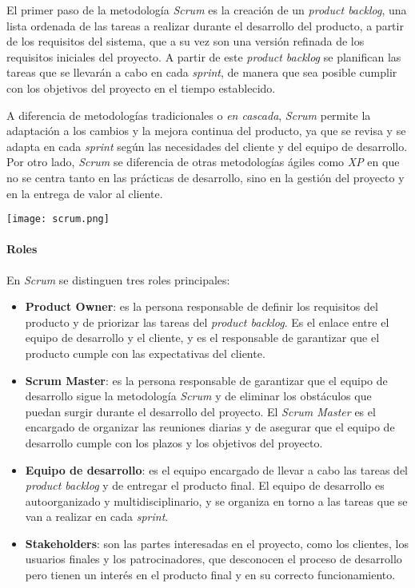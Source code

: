 El primer paso de la metodología \textit{Scrum} es la creación de un \textit{product backlog},
una lista ordenada de las tareas a realizar durante el desarrollo del producto, a partir de los
requisitos del sistema, que a su vez son una versión refinada de los requisitos iniciales del
proyecto. A partir de este \textit{product backlog} se planifican las tareas que se llevarán
a cabo en cada \textit{sprint}, de manera que sea posible cumplir con los objetivos del proyecto
en el tiempo establecido.

A diferencia de metodologías tradicionales o \emph{en cascada}, \textit{Scrum} permite la adaptación
a los cambios y la mejora continua del producto, ya que se revisa y se adapta en cada \textit{sprint}
según las necesidades del cliente y del equipo de desarrollo. Por otro lado, \textit{Scrum} se
diferencia de otras metodologías ágiles como \textit{XP} en que no se centra tanto en las
prácticas de desarrollo, sino en la gestión del proyecto y en la entrega de valor al cliente.

\begin{minipage}{\linewidth}
	\centering
	\texttt{[image: scrum.png]}
\end{minipage}

\paragraph{Roles}
En \textit{Scrum} se distinguen tres roles principales:

\begin{itemize}
	\item \textbf{Product Owner}: es la persona responsable de definir los requisitos del producto
		y de priorizar las tareas del \textit{product backlog}. Es el enlace entre el equipo de
		desarrollo y el cliente, y es el responsable de garantizar que el producto cumple con las
		expectativas del cliente.
	\item \textbf{Scrum Master}: es la persona responsable de garantizar que el equipo de desarrollo
		sigue la metodología \textit{Scrum} y de eliminar los obstáculos que puedan surgir durante
		el desarrollo del proyecto. El \textit{Scrum Master} es el encargado de organizar las
		reuniones diarias y de asegurar que el equipo de desarrollo cumple con los plazos y los
		objetivos del proyecto.
	\item \textbf{Equipo de desarrollo}: es el equipo encargado de llevar a cabo las tareas del
		\textit{product backlog} y de entregar el producto final. El equipo de desarrollo es
		autoorganizado y multidisciplinario, y se organiza en torno a las tareas que se van a
		realizar en cada \textit{sprint}.
	\item \textbf{Stakeholders}: son las partes interesadas en el proyecto, como los clientes,
		los usuarios finales y los patrocinadores, que desconocen el proceso de desarrollo pero
		tienen un interés en el producto final y en su correcto funcionamiento.
\end{itemize}

